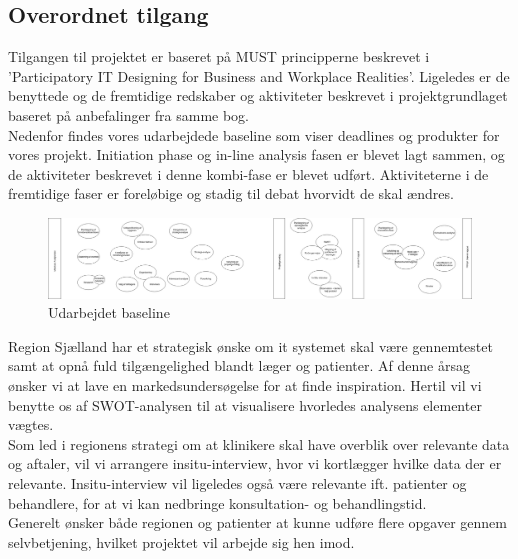 \subsection{Overordnet tilgang}
Tilgangen til projektet er baseret på MUST principperne beskrevet i 'Participatory IT Designing for Business and Workplace Realities'. Ligeledes er de benyttede og de fremtidige redskaber og aktiviteter beskrevet i projektgrundlaget baseret på anbefalinger fra samme bog.\\
Nedenfor findes vores udarbejdede baseline som viser deadlines og produkter for vores projekt. Initiation phase og in-line analysis fasen er blevet lagt sammen, og de aktiviteter beskrevet i denne kombi-fase er blevet udført. Aktiviteterne i de fremtidige faser er foreløbige og stadig til debat hvorvidt de skal ændres. 
\begin{figure}[H]
	\includegraphics[width=\textwidth]{Materials/Baseline}
	\caption{Udarbejdet baseline}
\end{figure}
Region Sjælland har et strategisk ønske om it systemet skal være gennemtestet samt at opnå fuld tilgængelighed blandt læger og patienter. Af denne årsag ønsker vi at lave en markedsundersøgelse for at finde inspiration. Hertil vil vi benytte os af SWOT-analysen til at visualisere hvorledes analysens elementer vægtes.\\
Som led i regionens strategi om at klinikere skal have overblik over relevante data og aftaler, vil vi arrangere insitu-interview, hvor vi kortlægger hvilke data der er relevante. Insitu-interview vil ligeledes også være relevante ift. patienter og behandlere, for at vi kan nedbringe konsultation- og behandlingstid.\\
Generelt ønsker både regionen og patienter at kunne udføre flere opgaver gennem selvbetjening, hvilket projektet vil arbejde sig hen imod.  
